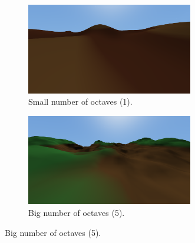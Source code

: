 \newpage
\begin{figure}[!htb]
    \centering
    \begin{subfigure}{0.45\textwidth}
        \centering
        \includegraphics[width=0.8\textwidth]{chapters/implementation/sections/terrain/resources/octaves-1.png}
        \caption{Small number of octaves (1).}
    \end{subfigure}
    \hfill
    \begin{subfigure}{0.45\textwidth}
        \centering
        \includegraphics[width=0.8\textwidth]{chapters/implementation/sections/terrain/resources/octaves-5.png}
        \caption{Big number of octaves (5).}
    \end{subfigure}


\end{figure}
